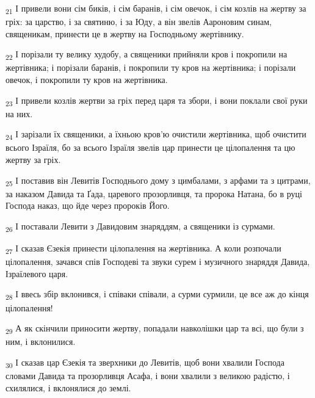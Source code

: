 \begin{tcolorbox}
\textsubscript{21} І привели вони сім биків, і сім баранів, і сім овечок, і сім козлів на жертву за гріх: за царство, і за святиню, і за Юду, а він звелів Аароновим синам, священикам, принести це в жертву на Господньому жертівнику.
\end{tcolorbox}
\begin{tcolorbox}
\textsubscript{22} І порізали ту велику худобу, а священики прийняли кров і покропили на жертівника; і порізали баранів, і покропили ту кров на жертівника; і порізали овечок, і покропили ту кров на жертівника.
\end{tcolorbox}
\begin{tcolorbox}
\textsubscript{23} І привели козлів жертви за гріх перед царя та збори, і вони поклали свої руки на них.
\end{tcolorbox}
\begin{tcolorbox}
\textsubscript{24} І зарізали їх священики, а їхньою кров'ю очистили жертівника, щоб очистити всього Ізраїля, бо за всього Ізраїля звелів цар принести це цілопалення та цю жертву за гріх.
\end{tcolorbox}
\begin{tcolorbox}
\textsubscript{25} І поставив він Левитів Господнього дому з цимбалами, з арфами та з цитрами, за наказом Давида та Ґада, царевого прозорливця, та пророка Натана, бо в руці Господа наказ, що йде через пророків Його.
\end{tcolorbox}
\begin{tcolorbox}
\textsubscript{26} І поставали Левити з Давидовим знаряддям, а священики із сурмами.
\end{tcolorbox}
\begin{tcolorbox}
\textsubscript{27} І сказав Єзекія принести цілопалення на жертівника. А коли розпочали цілопалення, зачався спів Господеві та звуки сурем і музичного знаряддя Давида, Ізраїлевого царя.
\end{tcolorbox}
\begin{tcolorbox}
\textsubscript{28} І ввесь збір вклонився, і співаки співали, а сурми сурмили, це все аж до кінця цілопалення!
\end{tcolorbox}
\begin{tcolorbox}
\textsubscript{29} А як скінчили приносити жертву, попадали навколішки цар та всі, що були з ним, і вклонилися.
\end{tcolorbox}
\begin{tcolorbox}
\textsubscript{30} І сказав цар Єзекія та зверхники до Левитів, щоб вони хвалили Господа словами Давида та прозорливця Асафа, і вони хвалили з великою радістю, і схилялися, і вклонялися до землі.
\end{tcolorbox}
